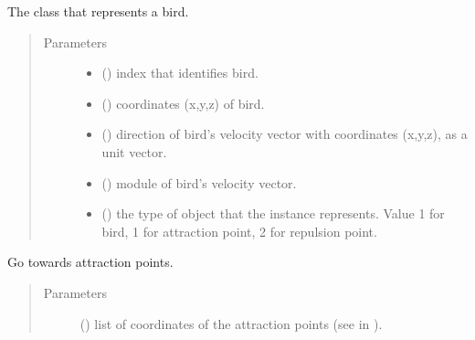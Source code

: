 \documentclass[a4paper,11pt,oneside,english]{sphinxmanual}
\begin{document}
\begin{fulllineitems}
\label{\detokenize{bird:bird.Bird}}
The class that represents a bird.
\begin{quote}\begin{description}
\item[{Parameters}] \leavevmode\begin{itemize}
\item {} 
 () \textendash{} index that identifies bird.

\item {} 
 () \textendash{} coordinates (x,y,z) of bird.

\item {} 
 () \textendash{} direction of bird’s velocity vector with coordinates (x,y,z), as a unit vector.

\item {} 
 () \textendash{} module of bird’s velocity vector.

\item {} 
 () \textendash{} the type of object that the instance represents. Value 1 for bird, \sphinxhyphen{}1 for attraction point, \sphinxhyphen{}2 for repulsion point.

\end{itemize}

\end{description}\end{quote}

\bigskip 
\bigskip 

\begin{fulllineitems}
\label{\detokenize{bird:bird.Bird.attraction}}
Go towards attraction points.
\begin{quote}\begin{description}
\item[{Parameters}] \leavevmode
{} () \textendash{} list of coordinates of the attraction points (see  in {\hyperref[\detokenize{parameters:module-0}]{}}).


\end{description}
\end{quote}
\end{fulllineitems}
\end{fulllineitems}
\end{document}
